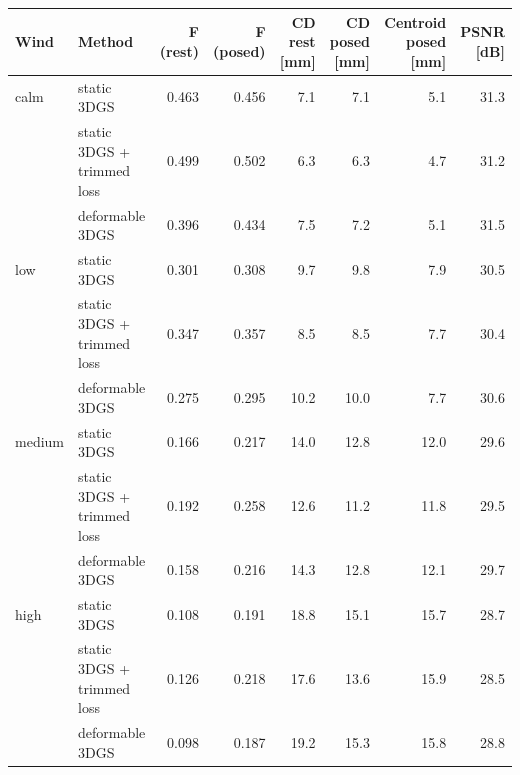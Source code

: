 \begin{tabular}{llrrrrrr}
\toprule
Wind & Method & F (rest) & F (posed) & CD rest [mm] & CD posed [mm] & Centroid posed [mm] & PSNR [dB] \\
\midrule
calm & static 3DGS & 0.463 & 0.456 & 7.1 & 7.1 & 5.1 & 31.3 \\
 & static 3DGS + trimmed loss & 0.499 & 0.502 & 6.3 & 6.3 & 4.7 & 31.2 \\
 & deformable 3DGS & 0.396 & 0.434 & 7.5 & 7.2 & 5.1 & 31.5 \\
\midrule
low & static 3DGS & 0.301 & 0.308 & 9.7 & 9.8 & 7.9 & 30.5 \\
 & static 3DGS + trimmed loss & 0.347 & 0.357 & 8.5 & 8.5 & 7.7 & 30.4 \\
 & deformable 3DGS & 0.275 & 0.295 & 10.2 & 10.0 & 7.7 & 30.6 \\
\midrule
medium & static 3DGS & 0.166 & 0.217 & 14.0 & 12.8 & 12.0 & 29.6 \\
 & static 3DGS + trimmed loss & 0.192 & 0.258 & 12.6 & 11.2 & 11.8 & 29.5 \\
 & deformable 3DGS & 0.158 & 0.216 & 14.3 & 12.8 & 12.1 & 29.7 \\
\midrule
high & static 3DGS & 0.108 & 0.191 & 18.8 & 15.1 & 15.7 & 28.7 \\
 & static 3DGS + trimmed loss & 0.126 & 0.218 & 17.6 & 13.6 & 15.9 & 28.5 \\
 & deformable 3DGS & 0.098 & 0.187 & 19.2 & 15.3 & 15.8 & 28.8 \\
\bottomrule
\end{tabular}
